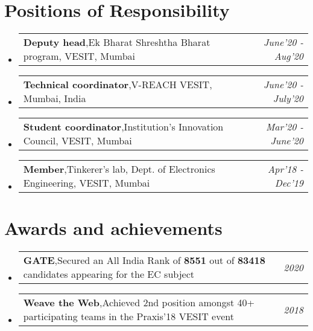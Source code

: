 \documentclass[a4paper,11pt]{article}
\makeatletter
\newcommand{\resumePOR}[3]{
\vspace{0.5mm}\item
    \begin{tabular*}{0.97\textwidth}[t]{l@{\extracolsep{\fill}}r}
        \textbf{#1},\hspace{0.3mm}#2 & \textit{\small{#3}} 
    \end{tabular*}
    \vspace{-2mm}
}
\newcommand{\resumeSubHeadingListStart}{\begin{itemize}[leftmargin=*,labelsep=0mm]}
\newcommand{\resumeSubHeadingListEnd}{\end{itemize}\vspace{2mm}}
\makeatother
\begin{document}
\section{\textbf{Positions of Responsibility}}
\vspace{-0.4mm}
\resumeSubHeadingListStart
  \resumePOR{Deputy head} %
    {Ek Bharat Shreshtha Bharat program, VESIT, Mumbai} %
    {June'20 - Aug'20} %
  \resumePOR{Technical coordinator} %
    {V-REACH VESIT, Mumbai, India} %
    {June'20 - July'20} %
  \resumePOR{Student coordinator} %
    {Institution's Innovation Council, VESIT, Mumbai} %
    {Mar'20 - June'20} %
  \resumePOR{Member} %
    {Tinkerer's lab, Dept. of Electronics Engineering, VESIT, Mumbai} %
    {Apr'18 - Dec'19} %
\resumeSubHeadingListEnd
\vspace{-4mm}


\section{\textbf{Awards and achievements}}
\vspace{-0.1mm}
\resumeSubHeadingListStart
\resumePOR{GATE} %
    {Secured an All India Rank of \textbf{8551} out of \textbf{83418} candidates appearing for the EC subject} %
    {2020} %
\vspace{-0.1mm}
\resumePOR{Weave the Web} %
    {Achieved 2nd position amongst 40+ participating teams in the Praxis'18 VESIT event} %
    {2018} %
\vspace{-0.1mm}
\resumeSubHeadingListEnd
\vfill
\end{document}
